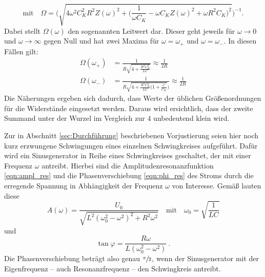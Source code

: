 \begin{equation}
    \text{mit} \quad \Omega = \Biggl(\sqrt{4 \omega ^2 C_K^2 R^2 Z(\omega)^2 + \bigl(\frac{1}{\omega C_K} - \omega C_K Z(\omega)^2 + \omega R^2 C_K\bigr)^2 }\Biggr)^{-1} .
\end{equation}
Dabei stellt $\Omega (\omega)$ den sogenannten Leitwert dar. 
Dieser geht jeweils für ${\omega \to 0}$ und ${\omega \to \infty }$ gegen Null und hat zwei Maxima für ${\omega = \omega _+}$ und 
${\omega = \omega _-}$. 
In diesen Fällen gilt:
\begin{align}
    \Omega (\omega _+) &= \frac{1}{R\sqrt{4 + \frac{R^2C_K^2}{LC}}} \approx \frac{1}{2R} \\
    \Omega (\omega _-) &= \frac{1}{R\sqrt{4 + \frac{R^2C_K^2}{LC}(1 + \frac{C}{C_K}})} \approx \frac{1}{2R}  
\end{align}
Die Näherungen ergeben sich dadurch, dass Werte der üblichen Größenordnungen für die Widerstände eingesetzt werden.
Daraus wird ersichtlich, dass der zweite Summand unter der Wurzel im Vergleich zur $4$ unbedeutend klein wird. 

Zur in Abschnitt \ref{sec:Durchführung} beschriebenen Vorjustierung seien hier noch kurz erzwungene Schwingungen eines einzelnen 
Schwingkreises aufgeführt. 
Dafür wird ein Sinusgenerator in Reihe eines Schwingkreises geschaltet, der mit einer Frequenz $\omega$ antreibt. 
Hierbei sind die Amplitudenresonanzfunktion \eqref{eqn:ampl_res} und die Phasenverschiebung \eqref{eqn:phi_res} des Stroms 
durch die erregende Spannung in 
Abhängigkeit der Frequenz $\omega$ von Interesse. 
Gemäß \cite{gerthsen} lauten diese 
\begin{equation}
    A(\omega)=\frac{U_0}{\sqrt{L^2(\omega _0^2 -\omega^2)^2 +R^2\omega^2}} \quad \text{mit} \quad 
    \omega _0=\sqrt{\frac{1}{LC}}
    \label{eqn:ampl_res}
\end{equation}
und 
\begin{equation}
    \tan \varphi=\frac{R\omega}{L(\omega _0^2 -\omega^2)}\: .
    \label{eqn:phi_res}
\end{equation}
Die Phasenverschiebung beträgt also genau $\sfrac{\pi}{2}$, wenn der Sinusgenerator mit der Eigenfrequenz -- auch 
Resonanzfrequenz -- den Schwingkreis antreibt. 

\pagebreak